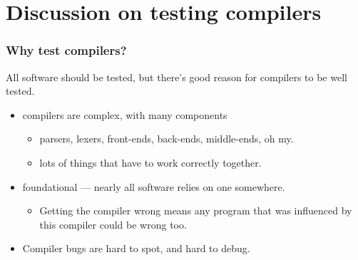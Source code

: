 \documentclass{beamer}
\begin{document}
\section{Discussion on testing compilers}

\begin{frame}
  \frametitle{Why test compilers?}

  All software should be tested, but there's good reason for compilers
  to be well tested.

  \begin{itemize}
  \item compilers are complex, with many components
          \begin{itemize}
          \item parsers, lexers, front-ends, back-ends, middle-ends, oh my.
          \item lots of things that have to work correctly together.
          \end{itemize}
  \item foundational --- nearly all software relies on one somewhere.
    \begin{itemize}
    \item Getting the compiler wrong means any program that was
      influenced by this compiler could be wrong too.
    \end{itemize}
  \item Compiler bugs are hard to spot, and hard to debug.
  \end{itemize}
\end{frame}


  
\end{document}
